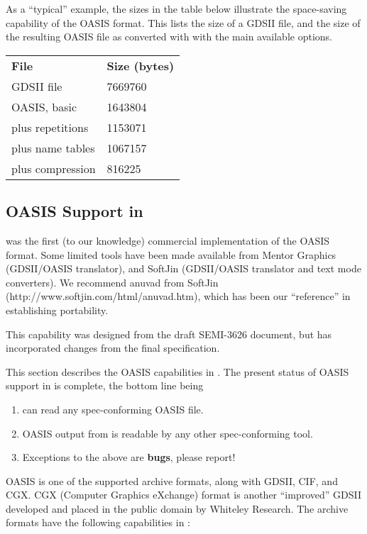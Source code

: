 As a ``typical'' example, the sizes in the table below illustrate the
space-saving capability of the OASIS format.  This lists the size of a
GDSII file, and the size of the resulting OASIS file as converted with
{\Xic} with the main available options.

\begin{tabular}{ll}
\bf File & \bf Size (bytes)\\
GDSII file &       7669760\\
OASIS, basic &     1643804\\
plus repetitions & 1153071\\
plus name tables & 1067157\\
plus compression & 816225\\
\end{tabular}

\subsection{OASIS Support in {\Xic}}

{\Xic} was the first (to our knowledge) commercial implementation of
the OASIS format.  Some limited tools have been made available from
Mentor Graphics (GDSII/OASIS translator), and SoftJin (GDSII/OASIS
translator and text mode converters).  We recommend {\vt anuvad} from
SoftJin \newline({\vt http://www.softjin.com/html/anuvad.htm}), which
has been our ``reference'' in establishing portability.

This capability was designed from the draft SEMI-3626 document, but
has incorporated changes from the final specification.

This section describes the OASIS capabilities in {\Xic}.  The present
status of OASIS support in {\Xic} is complete, the bottom line being

\begin{enumerate}
\item{{\Xic} can read any spec-conforming OASIS file.}
\item{OASIS output from {\Xic} is readable by any other
    spec-conforming tool.}
\item{Exceptions to the above are {\bf bugs}, please report!}
\end{enumerate}

OASIS is one of the supported archive formats, along with GDSII, CIF,
and CGX.  CGX (Computer Graphics eXchange) format is another
``improved'' GDSII developed and placed in the public domain by
Whiteley Research.  The archive formats have the following
capabilities in {\Xic}:

